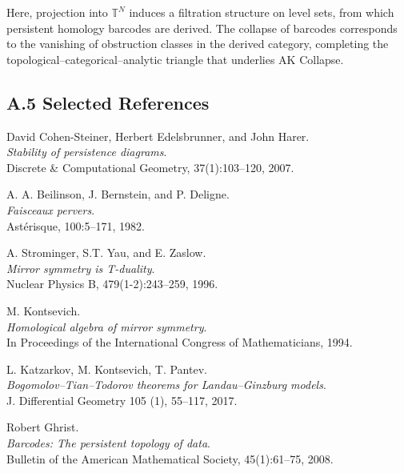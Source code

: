\documentclass[11pt]{article}
\begin{document}
Here, projection into $\mathbb{T}^N$ induces a filtration structure on level sets, from which persistent homology barcodes are derived.  
The collapse of barcodes corresponds to the vanishing of obstruction classes in the derived category, completing the topological–categorical–analytic triangle that underlies AK Collapse.

\subsection*{A.5 Selected References}

\begin{thebibliography}{9}

David Cohen-Steiner, Herbert Edelsbrunner, and John Harer.\\
\textit{Stability of persistence diagrams}.\\
Discrete \& Computational Geometry, 37(1):103--120, 2007.

A. A. Beilinson, J. Bernstein, and P. Deligne.\\
\textit{Faisceaux pervers}.\\
Ast\'erisque, 100:5–171, 1982.

A. Strominger, S.T. Yau, and E. Zaslow.\\
\textit{Mirror symmetry is T-duality}.\\
Nuclear Physics B, 479(1-2):243–259, 1996.

M. Kontsevich.\\
\textit{Homological algebra of mirror symmetry}.\\
In Proceedings of the International Congress of Mathematicians, 1994.

L. Katzarkov, M. Kontsevich, T. Pantev.\\
\textit{Bogomolov–Tian–Todorov theorems for Landau–Ginzburg models}.\\
J. Differential Geometry 105 (1), 55–117, 2017.

Robert Ghrist.\\
\textit{Barcodes: The persistent topology of data}.\\
Bulletin of the American Mathematical Society, 45(1):61--75, 2008.

\end{thebibliography}


\end{document}
